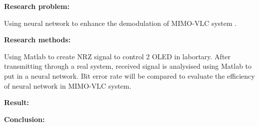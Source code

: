 \vspace{\baselineskip}
\textbf{Research problem:}

Using neural network to enhance the demodulation of MIMO-VLC system .
\vspace{\baselineskip}

\textbf{Research methods:}

Using Matlab to create NRZ signal to control 2 OLED in labortary. After transmitting through a real system, received signal is analysised using Matlab to put in a neural network. Bit error rate will be compared to evaluate the efficiency of neural network in MIMO-VLC system.
\vspace{\baselineskip}

\textbf{Result:}
\vspace{\baselineskip}

\textbf{Conclusion:}